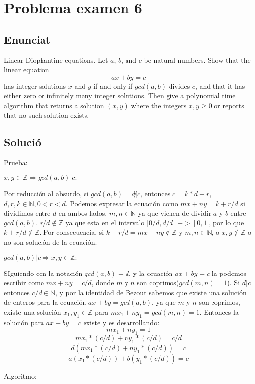 \section{Problema examen 6}
\subsection{Enunciat}
Linear Diophantine equations. Let $a$, $b$, and $c$ be natural numbers. Show that the linear equation
\[
ax + by = c
\]
has integer solutions $x$ and $y$ if and only if $gcd(a,b)$ divides $c$, and that it has either zero or infinitely many integer solutions. Then give a polynomial time algorithm that returns a solution $(x,y)$ where the integers $x,y \geq 0$ or reports that no such solution exists.

\subsection{Solució}

Prueba:

$x,y \in \mathbb{Z} \Longrightarrow gcd(a,b) | c:$ 

Por reducción al absurdo, si $gcd(a,b) = d \not| c$, entonces $c = k*d + r$, $d,r,k \in \mathbb{N}, 0 < r < d$. Podemos expresar la ecuación como $mx + ny = k + r/d$ si dividimos entre $d$ en ambos lados. $m,n \in \mathbb{N}$ ya que vienen de dividir $a$ y $b$ entre $gcd(a,b)$. $r/d \not\in \mathbb{Z}$ ya que esta en el intervalo $]0/d, d/d[ -> ]0,1[$, por lo que $k+r/d \not\in \mathbb{Z}$. Por consecuencia, si $k+r/d=mx+ny \not\in \mathbb{Z}$ y $m,n \in \mathbb{N}$, o $x,y \not\in \mathbb{Z}$ o no son solución de la ecuación.



$gcd(a,b) | c \Longrightarrow x,y \in \mathbb{Z}:$ 

SIguiendo con la notación $gcd(a,b) = d$, y la ecuación $ax+by=c$ la podemos escribir como $mx+ny=c/d$, donde $m$ y $n$ son coprimos($gcd(m,n)=1$). Si $d|c$ entonces $c/d \in \mathbb{N}$, y por la identidad de Bezout sabemos que existe una solución de enteros para la ecuación $ax+by=gcd(a,b)$. ya que $m$ y $n$ son coprimos, existe una solución  $x_1,y_1 \in \mathbb{Z}$ para $mx_1+ny_1=gcd(m,n)=1$. Entonces la solución para $ax+by=c$ existe y es desarrollando:
\[
mx_1+ny_1=1
\]
\[
mx_1*(c/d)+ny_1*(c/d) = c/d
\]
\[
d(mx_1*(c/d)+ny_1*(c/d))=c
\]
\[
a(x_1*(c/d))+b(y_1*(c/d))=c
\]

Algoritmo:

